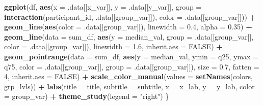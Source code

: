 \documentclass[
]{article}
\newenvironment{Shaded}{\begin{snugshade}}{\end{snugshade}}
\newcommand{\AttributeTok}[1]{\textcolor[rgb]{0.13,0.29,0.53}{#1}}
\newcommand{\ConstantTok}[1]{\textcolor[rgb]{0.56,0.35,0.01}{#1}}
\newcommand{\DecValTok}[1]{\textcolor[rgb]{0.00,0.00,0.81}{#1}}
\newcommand{\FloatTok}[1]{\textcolor[rgb]{0.00,0.00,0.81}{#1}}
\newcommand{\FunctionTok}[1]{\textcolor[rgb]{0.13,0.29,0.53}{\textbf{#1}}}
\newcommand{\NormalTok}[1]{#1}
\newcommand{\SpecialCharTok}[1]{\textcolor[rgb]{0.81,0.36,0.00}{\textbf{#1}}}
\newcommand{\StringTok}[1]{\textcolor[rgb]{0.31,0.60,0.02}{#1}}
\begin{document}
\begin{Shaded}
\begin{Highlighting}[]
  \FunctionTok{ggplot}\NormalTok{(df, }\FunctionTok{aes}\NormalTok{(}\AttributeTok{x =}\NormalTok{ .data[[x\_var]], }\AttributeTok{y =}\NormalTok{ .data[[y\_var]],}
                  \AttributeTok{group =} \FunctionTok{interaction}\NormalTok{(participant\_id, .data[[group\_var]]),}
                  \AttributeTok{color =}\NormalTok{ .data[[group\_var]])) }\SpecialCharTok{+}
    \FunctionTok{geom\_line}\NormalTok{(}\FunctionTok{aes}\NormalTok{(}\AttributeTok{color =}\NormalTok{ .data[[group\_var]]), }\AttributeTok{linewidth =} \FloatTok{0.4}\NormalTok{, }\AttributeTok{alpha =} \FloatTok{0.35}\NormalTok{) }\SpecialCharTok{+}
    \FunctionTok{geom\_line}\NormalTok{(}\AttributeTok{data =}\NormalTok{ sum\_df,}
              \FunctionTok{aes}\NormalTok{(}\AttributeTok{y =}\NormalTok{ median\_val, }\AttributeTok{group =}\NormalTok{ .data[[group\_var]],}
                  \AttributeTok{color =}\NormalTok{ .data[[group\_var]]),}
              \AttributeTok{linewidth =} \FloatTok{1.6}\NormalTok{, }\AttributeTok{inherit.aes =} \ConstantTok{FALSE}\NormalTok{) }\SpecialCharTok{+}
    \FunctionTok{geom\_pointrange}\NormalTok{(}\AttributeTok{data =}\NormalTok{ sum\_df,}
                    \FunctionTok{aes}\NormalTok{(}\AttributeTok{y =}\NormalTok{ median\_val, }\AttributeTok{ymin =}\NormalTok{ q25, }\AttributeTok{ymax =}\NormalTok{ q75,}
                        \AttributeTok{color =}\NormalTok{ .data[[group\_var]], }\AttributeTok{group =}\NormalTok{ .data[[group\_var]]),}
                    \AttributeTok{size =} \FloatTok{0.7}\NormalTok{, }\AttributeTok{fatten =} \DecValTok{4}\NormalTok{, }\AttributeTok{inherit.aes =} \ConstantTok{FALSE}\NormalTok{) }\SpecialCharTok{+}
    \FunctionTok{scale\_color\_manual}\NormalTok{(}\AttributeTok{values =} \FunctionTok{setNames}\NormalTok{(colors, grp\_lvls)) }\SpecialCharTok{+}
    \FunctionTok{labs}\NormalTok{(}\AttributeTok{title =}\NormalTok{ title, }\AttributeTok{subtitle =}\NormalTok{ subtitle,}
         \AttributeTok{x =}\NormalTok{ x\_lab, }\AttributeTok{y =}\NormalTok{ y\_lab, }\AttributeTok{color =}\NormalTok{ group\_var) }\SpecialCharTok{+}
    \FunctionTok{theme\_study}\NormalTok{(}\AttributeTok{legend =} \StringTok{"right"}\NormalTok{)}
\NormalTok{\}}


\end{Highlighting}
\end{Shaded}
\end{document}
